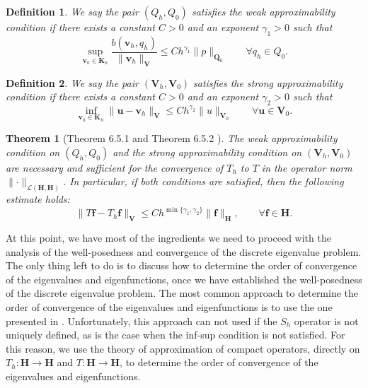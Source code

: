 \documentclass[USenglish]{article}
\theoremstyle{dgthm}
\newtheorem{theorem}{Theorem}
\theoremstyle{dgdef}
\newtheorem{definition}{Definition}
\let\vec\bm
\newcommand\norm[1]{\lVert#1\rVert}
\begin{document}
\begin{definition}
  We say the pair $(Q_h,Q_0)$ satisfies the weak approximability condition if there exists a constant $C>0$ and an exponent $\gamma_1>0$ such that
  \begin{equation}
    \underset{\vec{v}_h\in \vec{K}_h}{\sup} \frac{b(\vec{v}_h,q_h)}{\norm{\vec{v}_h}_{\vec{V}}} \leq C h^{\gamma_1}\norm{p}_{\vec{Q}_0} \qquad \forall q_h\in Q_0.
  \end{equation}
\end{definition}
\begin{definition}
  We say the pair $(\vec{V}_h,\vec{V}_0)$ satisfies the strong approximability condition if there exists a constant $C>0$ and an exponent $\gamma_2>0$ such that
  \begin{equation}
    \underset{\vec{v}_h\in \vec{K}_h}{\inf} \norm{\vec{u}-\vec{v}_h}_{\vec{V}} \leq C h^{\gamma_2}\norm{u}_{\vec{V}_0} \qquad \forall \vec{u}\in \vec{V}_0.
  \end{equation}
\end{definition}
\begin{theorem}[Theorem 6.5.1 and Theorem 6.5.2 \cite{BBF}]
  The weak approximability condition on $(Q_h,Q_0)$ and the strong approximability condition on $(\vec{V}_h,\vec{V}_0)$ are necessary and sufficient for the convergence of $T_h$ to $T$ in the operator norm $\norm{\cdot}_{\mathcal{L}(\vec{H},\vec{H})}$.
  In particular, if both conditions are satisfied, then the following estimate holds:
  \begin{equation}
    \norm{T\vec{f}-T_h\vec{f}}_{\vec{V}}\leq C h^{\min\{\gamma_1,\gamma_2\}}\norm{\vec{f}}_{\vec{H}}, \qquad \forall \vec{f}\in \vec{H}.
  \end{equation}
\end{theorem}
At this point, we have most of the ingredients we need to proceed with the analysis of the well-posedness and convergence of the discrete eigenvalue problem.
The only thing left to do is to discuss how to determine the order of convergence of the eigenvalues and eigenfunctions, once we have established the well-posedness of the discrete eigenvalue problem.
The most common approach to determine the order of convergence of the eigenvalues and eigenfunctions is to use the one presented in \cite{MercierOsbornRappazRaviart}.
Unfortunately, this approach can not used if the $S_h$ operator is not uniquely defined, as is the case when the inf-sup condition is not satisfied.
For this reason, we use the theory of approximation of compact operators, directly on $T_h:\vec{H}\to\vec{H}$ and $T:\vec{H}\to\vec{H}$, to determine the order of convergence of the eigenvalues and eigenfunctions.
\end{document}
